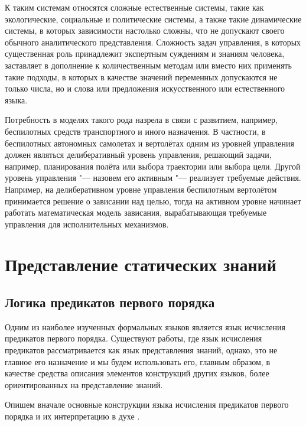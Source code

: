 \documentclass[b5paper,11pt]{book}
\numberwithin{Def}{section}
\numberwithin{Th}{chapter}
\numberwithin{St}{chapter}
\begin{document}
	К таким системам относятся сложные естественные системы, такие как экологические, социальные и политические системы, а также такие динамические системы, в которых зависимости настолько сложны, что не допускают своего обычного аналитического представления. Сложность задач управления, в которых существенная роль принадлежит экспертным суждениям и знаниям человека, заставляет в дополнение к количественным методам или вместо них применять такие подходы, в которых в качестве значений переменных допускаются не только числа, но и слова или предложения искусственного или естественного языка. 
	
	Потребность в моделях такого рода назрела в связи с развитием, например, беспилотных средств транспортного и иного назначения. В частности, в беспилотных автономных самолетах и вертолётах одним из уровней управления должен являться делиберативный уровень управления, решающий задачи, например, планирования полёта или выбора траектории или выбора цели. Другой уровень управления "--- назовем его активным "--- реализует требуемые действия. Например, на  делиберативном уровне управления беспилотным вертолётом принимается решение о зависании над целью, тогда на активном уровне начинает работать математическая модель зависания, вырабатывающая требуемые управления для исполнительных механизмов.
	
	\chapter{Представление статических знаний}
	
	\section{Логика предикатов первого порядка}
	Одним из наиболее изученных формальных языков является язык исчисления предикатов первого порядка. Существуют работы, где язык исчисления предикатов рассматривается как язык представления знаний, однако, это не главное его назначение и мы будем использовать его, главным образом, в качестве средства описания элементов конструкций других языков, более ориентированных на представление знаний. 
	
	Опишем вначале основные конструкции языка исчисления предикатов первого порядка и их интерпретацию в духе \cite{Klini1973,Keisler1977}.
	
\end{document}
